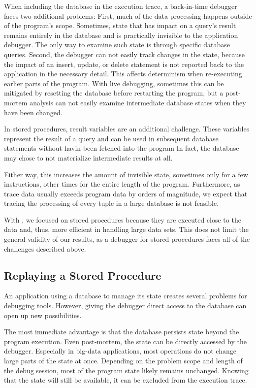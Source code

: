When including the database in the execution trace, a back-in-time debugger faces two additional problems:
First, much of the data processing happens outside of the program's scope.
Sometimes, state that has impact on a query's result remains entirely in the database and is practically invisible to the application debugger.
The only way to examine such state is through specific database queries.
Second, the debugger can not easily track changes in the state, because the impact of an insert, update, or delete statement is not reported back to the application in the necessary detail.
This affects determinism when re-executing earlier parts of the program.
With live debugging, sometimes this can be mitigated by resetting the database before restarting the program, but a post-mortem analysis can not easily examine intermediate database states when they have been changed.

In stored procedures, result variables are an additional challenge.
These variables represent the result of a query and can be used in subsequent database statements without havin been fetched into the program
In fact, the database may chose to not materialize intermediate results at all.

\tmpStart
Either way, this increases the amount of invisible state, sometimes only for a few instructions, other times for the entire length of the program.
Furthermore, as trace data usually exceeds program data by orders of magnitude, we expect that tracing the processing of every tuple in a large database is not feasible.

With \tool, we focused on stored procedures because they are executed close to the data and, thus, more efficient in handling large data sets.
This does not limit the general validity of our results, as a debugger for stored procedures faces all of the challenges described above.
\tmpEnd

\subsection{Replaying a Stored Procedure}

An application using a database to manage its state creates several problems for debugging tools.
However, giving the debugger direct access to the database can open up new possibilities.

The most immediate advantage is that the database persists state beyond the program execution.
Even post-mortem, the state can be directly accessed by the debugger.
Especially in big-data applications, most operations do not change large parts of the state at once.
Depending on the problem scope and length of the debug session, most of the program state likely remains unchanged.
Knowing that the state will still be available, it can be excluded from the execution trace.

